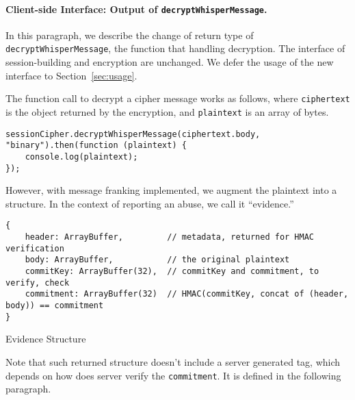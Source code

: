 \documentclass{article}
\begin{document}
\paragraph{Client-side Interface: Output of {\tt decryptWhisperMessage}.}
In this paragraph, 
we describe the change of return type of {\tt decryptWhisperMessage},
the function that handling decryption.
The interface of session-building and encryption are unchanged.
We defer the usage of the new interface to Section~\ref{sec:usage}.

The function call to decrypt a cipher message works as follows,
where {\tt ciphertext} is the object returned by the encryption,
and {\tt plaintext} is an array of bytes.
{\small
\begin{verbatim}
sessionCipher.decryptWhisperMessage(ciphertext.body, "binary").then(function (plaintext) {
    console.log(plaintext);
});
\end{verbatim}
}
However, with message franking implemented,
we augment the plaintext into a structure.
In the context of reporting an abuse, we call it ``evidence.''
\begin{table}
{\small
\begin{verbatim}
{
    header: ArrayBuffer,         // metadata, returned for HMAC verification
    body: ArrayBuffer,           // the original plaintext
    commitKey: ArrayBuffer(32),  // commitKey and commitment, to verify, check
    commitment: ArrayBuffer(32)  // HMAC(commitKey, concat of (header, body)) == commitment
}
\end{verbatim}
}
\caption{Evidence Structure}
\end{table}
Note that such returned structure doesn't include a server generated tag,
which depends on how does server verify the {\tt commitment}.
It is defined in the following paragraph.
\end{document}

